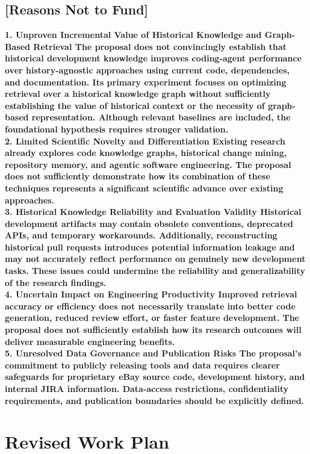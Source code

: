 \documentclass[11pt]{article}
\begin{document}
\subsection*{[Reasons Not to Fund]}
\textbf{1. Unproven Incremental Value of Historical Knowledge and Graph-Based Retrieval
The proposal does not convincingly establish that historical development knowledge improves coding-agent performance over history-agnostic approaches using current code, dependencies, and documentation. Its primary experiment focuses on optimizing retrieval over a historical knowledge graph without sufficiently establishing the value of historical context or the necessity of graph-based representation. Although relevant baselines are included, the foundational hypothesis requires stronger validation.\\
2. Limited Scientific Novelty and Differentiation
Existing research already explores code knowledge graphs, historical change mining, repository memory, and agentic software engineering. The proposal does not sufficiently demonstrate how its combination of these techniques represents a significant scientific advance over existing approaches.\\
3. Historical Knowledge Reliability and Evaluation Validity
Historical development artifacts may contain obsolete conventions, deprecated APIs, and temporary workarounds. Additionally, reconstructing historical pull requests introduces potential information leakage and may not accurately reflect performance on genuinely new development tasks. These issues could undermine the reliability and generalizability of the research findings.\\
4. Uncertain Impact on Engineering Productivity
Improved retrieval accuracy or efficiency does not necessarily translate into better code generation, reduced review effort, or faster feature development. The proposal does not sufficiently establish how its research outcomes will deliver measurable engineering benefits.\\
5. Unresolved Data Governance and Publication Risks
The proposal's commitment to publicly releasing tools and data requires clearer safeguards for proprietary eBay source code, development history, and internal JIRA information. Data-access restrictions, confidentiality requirements, and publication boundaries should be explicitly defined.
}



\section*{Revised Work Plan}
\end{document}
